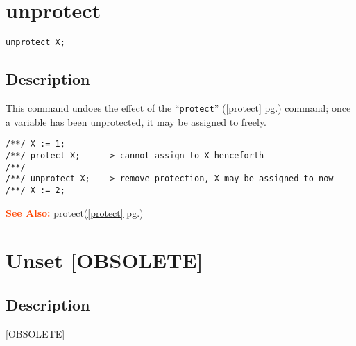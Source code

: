 \documentclass[a4paper]{mybook}
\newenvironment{command}{}{} %
\newcommand\SeeAlso{\par\textcolor{OrangeRed}{\textbf{\large See Also: }}}
\begin{document}
\section{unprotect}
\label{unprotect}
\begin{command} %


\begin{Verbatim}[label=syntax, rulecolor=\color{MidnightBlue},
frame=single]
unprotect X;
\end{Verbatim}


\subsection*{Description}

This command undoes the effect of the ``\verb&protect&'' (\ref{protect} pg.\pageref{protect}) command; once a
variable has been unprotected, it may be assigned to freely.
\begin{Verbatim}[label=example, rulecolor=\color{PineGreen}, frame=single]
/**/ X := 1;
/**/ protect X;    --> cannot assign to X henceforth
/**/
/**/ unprotect X;  --> remove protection, X may be assigned to now
/**/ X := 2;
\end{Verbatim}


\SeeAlso %
  protect(\ref{protect} pg.\pageref{protect})
\end{command} %

\section{Unset [OBSOLETE]}
\label{Unset [OBSOLETE]}
\begin{command} %



\subsection*{Description}

[OBSOLETE]

\end{command} %
\end{document}
